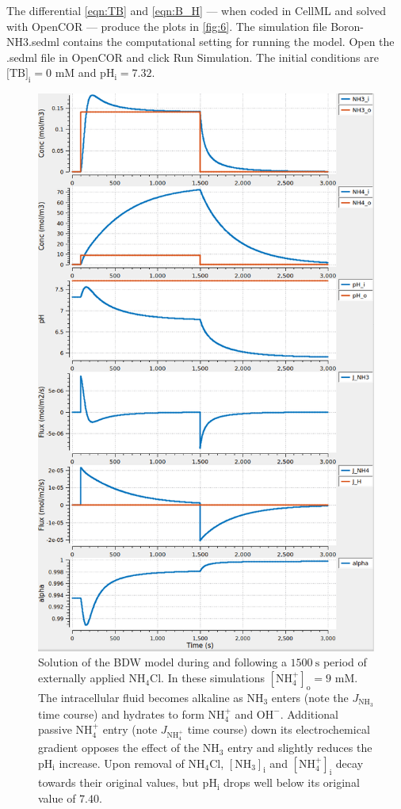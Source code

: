 \documentclass[fleqn,10pt]{physiome}
\begin{document}
The differential \autoref{eqn:TB} and \autoref{eqn:B_H} --- when coded in CellML and solved with OpenCOR --- produce the plots in \autoref{fig:6}. The simulation file Boron-NH3.sedml contains the computational setting for running the model. Open the .sedml file in OpenCOR and click Run Simulation. The initial conditions are $[\mathrm{TB]_i} = 0$ $\mathrm{mM}$ and $\mathrm{pH_i}=7.32$.

\begin{figure}[ht!]
\centering
\includegraphics[width=0.8\linewidth]{img/Figure 6.png}
\caption{\label{fig:6} Solution of the BDW model during and following a $1500~\mathrm{s}$ period of externally applied $\mathrm{NH_4Cl}$. In these simulations $\mathrm{[NH_4^+]_o}=9$ $\mathrm{mM}$. The intracellular fluid becomes alkaline as $\mathrm{NH_3}$ enters (note the $J_\mathrm{NH_3}$ time course) and hydrates to form $\mathrm{NH_4^+}$ and $\mathrm{OH^-}$. Additional passive $\mathrm{NH_4^+}$ entry (note $J_\mathrm{NH_4^+}$ time course) down its electrochemical gradient opposes the effect of the $\mathrm{NH_3}$ entry and slightly reduces the $\mathrm{pH_i}$ increase. Upon removal of $\mathrm{NH_4Cl}$, $\mathrm{[NH_3]_i}$ and $\mathrm{[NH_4^+]_i}$ decay towards their original values, but $\mathrm{pH_i}$ drops well below its original value of $7.40$.}
\end{figure}
\end{document}
